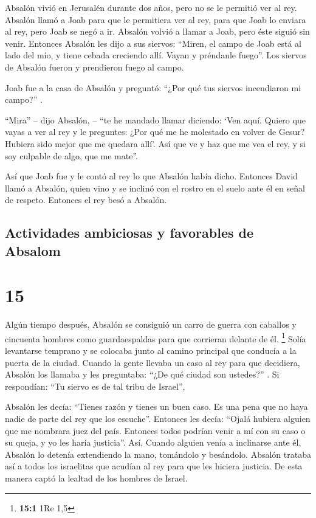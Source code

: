  Absalón vivió en Jerusalén durante dos años, pero no se
le permitió ver al rey.  Absalón llamó a Joab para que le
permitiera ver al rey, para que Joab lo enviara al rey, pero Joab se
negó a ir. Absalón volvió a llamar a Joab, pero éste siguió sin venir.
 Entonces Absalón les dijo a sus siervos: ``Miren, el
campo de Joab está al lado del mío, y tiene cebada creciendo allí. Vayan
y préndanle fuego''. Los siervos de Absalón fueron y prendieron fuego al
campo.

 Joab fue a la casa de Absalón y preguntó: ``¿Por qué tus
siervos incendiaron mi campo?'' .

 ``Mira'' -- dijo Absalón, -- ``te he mandado llamar
diciendo: `Ven aquí. Quiero que vayas a ver al rey y le preguntes: ¿Por
qué me he molestado en volver de Gesur? Hubiera sido mejor que me
quedara allí'. Así que ve y haz que me vea el rey, y si soy culpable de
algo, que me mate''.

 Así que Joab fue y le contó al rey lo que Absalón había
dicho. Entonces David llamó a Absalón, quien vino y se inclinó con el
rostro en el suelo ante él en señal de respeto. Entonces el rey besó a
Absalón.

\hypertarget{actividades-ambiciosas-y-favorables-de-absalom}{%
\subsection{Actividades ambiciosas y favorables de
Absalom}\label{actividades-ambiciosas-y-favorables-de-absalom}}

\hypertarget{section-14}{%
\section{15}\label{section-14}}

 Algún tiempo después, Absalón se consiguió un carro de
guerra con caballos y cincuenta hombres como guardaespaldas para que
corrieran delante de él. \footnote{\textbf{15:1} 1Re 1,5} 
Solía levantarse temprano y se colocaba junto al camino principal que
conducía a la puerta de la ciudad. Cuando la gente llevaba un caso al
rey para que decidiera, Absalón los llamaba y les preguntaba: ``¿De qué
ciudad son ustedes?'' . Si respondían: ``Tu siervo es de tal tribu de
Israel'',

 Absalón les decía: ``Tienes razón y tienes un buen caso.
Es una pena que no haya nadie de parte del rey que los escuche''.
 Entonces les decía: ``Ojalá hubiera alguien que me
nombrara juez del país. Entonces todos podrían venir a mí con su caso o
su queja, y yo les haría justicia''.  Así, Cuando alguien
venía a inclinarse ante él, Absalón lo detenía extendiendo la mano,
tomándolo y besándolo.  Absalón trataba así a todos los
israelitas que acudían al rey para que les hiciera justicia. De esta
manera captó la lealtad de los hombres de Israel.

